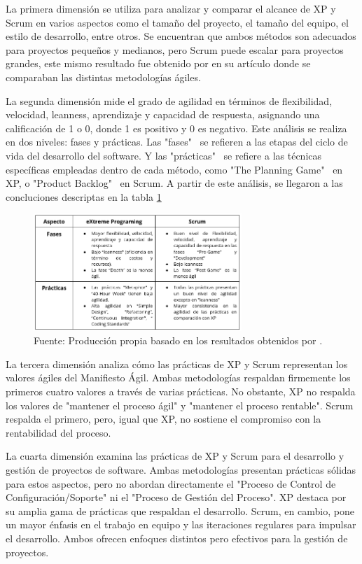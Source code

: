 \documentclass[a4paper,10pt]{article}
\begin{document}
	La primera dimensión se utiliza para analizar y comparar el alcance de XP y Scrum en varios aspectos como el tamaño del proyecto, el tamaño del equipo, el estilo de desarrollo, entre otros. Se encuentran que ambos métodos son adecuados para proyectos pequeños y medianos, pero Scrum puede escalar para proyectos grandes, este mismo resultado fue obtenido por \textcite{quinonez2017analisis} en su artículo donde se comparaban las distintas metodologías ágiles.
	
	La segunda dimensión mide el grado de agilidad en términos de flexibilidad, velocidad, leanness, aprendizaje y capacidad de respuesta, asignando una calificación de 1 o 0, donde 1 es positivo y 0 es negativo. Este análisis se realiza en dos niveles: fases y prácticas. Las "fases" \ se refieren a las etapas del ciclo de vida del desarrollo del software. Y las "prácticas" \ se refiere a las técnicas específicas empleadas dentro de cada método, como "The Planning Game" \ en XP, o "Product Backlog" \ en Scrum. A partir de este análisis, se llegaron a las concluciones descriptas en la tabla \ref{tabla_resultado_2daDimencon_4D}
	\begin{figure}[h]
		\centering
		\includegraphics[width=0.7\textwidth]{tabla-resultados-segunda-fase.png}
		\caption{Fuente: Producción propia basado en los resultados obtenidos por \textcite{Gill_Henderson-Sellers_2006}.}
		\label{tabla_resultado_2daDimencon_4D}
	\end{figure}\newline
	La tercera dimensión analiza cómo las prácticas de XP y Scrum representan los valores ágiles del Manifiesto Ágil. Ambas metodologías respaldan firmemente los primeros cuatro valores a través de varias prácticas. No obstante, XP no respalda los valores de "mantener el proceso ágil" y "mantener el proceso rentable". Scrum respalda el primero, pero, igual que XP, no sostiene el compromiso con la rentabilidad del proceso.
	
	La cuarta dimensión examina las prácticas de XP y Scrum para el desarrollo y gestión de proyectos de software. Ambas metodologías presentan prácticas sólidas para estos aspectos, pero no abordan directamente el "Proceso de Control de Configuración/Soporte" ni el "Proceso de Gestión del Proceso". XP destaca por su amplia gama de prácticas que respaldan el desarrollo. Scrum, en cambio, pone un mayor énfasis en el trabajo en equipo y las iteraciones regulares para impulsar el desarrollo. Ambos ofrecen enfoques distintos pero efectivos para la gestión de proyectos.
	
\end{document}
